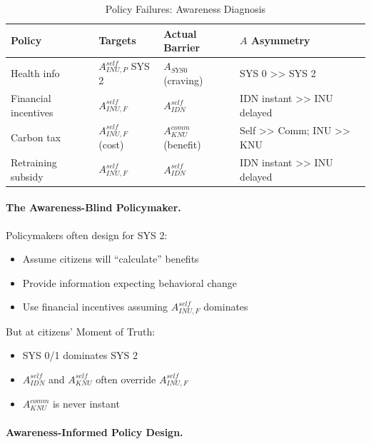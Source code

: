 \begin{table}[htbp]
\centering
\caption{Policy Failures: Awareness Diagnosis}
\label{tab:policy-awareness}
\renewcommand{\arraystretch}{1.3}
\begin{tabular}{@{}llll@{}}
\toprule
\textbf{Policy} & \textbf{Targets} & \textbf{Actual Barrier} & \textbf{$A$ Asymmetry} \\
\midrule
Health info & $A^{self}_{INU,P}$ SYS 2 & $A_{SYS0}$ (craving) & SYS 0 >> SYS 2 \\
Financial incentives & $A^{self}_{INU,F}$ & $A^{self}_{IDN}$ & IDN instant >> INU delayed \\
Carbon tax & $A^{self}_{INU,F}$ (cost) & $A^{comm}_{KNU}$ (benefit) & Self >> Comm; INU >> KNU \\
Retraining subsidy & $A^{self}_{INU,F}$ & $A^{self}_{IDN}$ & IDN instant >> INU delayed \\
\bottomrule
\end{tabular}
\end{table}

\paragraph{The Awareness-Blind Policymaker.}
Policymakers often design for SYS 2:
\begin{itemize}
\item Assume citizens will ``calculate'' benefits
\item Provide information expecting behavioral change
\item Use financial incentives assuming $A^{self}_{INU,F}$ dominates
\end{itemize}

But at citizens' Moment of Truth:
\begin{itemize}
\item SYS 0/1 dominates SYS 2
\item $A^{self}_{IDN}$ and $A^{self}_{KNU}$ often override $A^{self}_{INU,F}$
\item $A^{comm}_{KNU}$ is never instant
\end{itemize}

\paragraph{Awareness-Informed Policy Design.}

